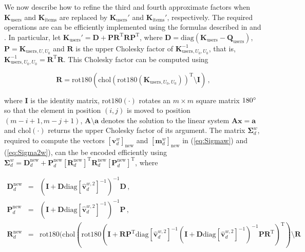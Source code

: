 \documentclass{article}
\begin{document}
We now describe how to refine the third and fourth approximate factors when $\mathbf{K}_\text{users}$ and
$\mathbf{K}_\text{items}$ are replaced by $\mathbf{K}_\text{users}'$ and $\mathbf{K}_\text{items}'$, respectively.
The required operations are can be efficiently implemented using the formulas
described in \citep{Guzman2007} and \citep{Lazaro2010}.
In particular, let $\mathbf{K}_\text{users}' = \mathbf{D} + \mathbf{P}
\mathbf{R}^\text{T} \mathbf{R} \mathbf{P}^\text{T}$,
where $\mathbf{D} = \text{diag}(\mathbf{K}_\text{users}-\mathbf{Q}_\text{users})$,
$\mathbf{P} = \mathbf{K}_{\text{users},U,U_0}$ and
$\mathbf{R}$ is the upper Cholesky factor of $\mathbf{K}_{\text{users},U_0,U_0}^{-1}$, that is,
$\mathbf{K}_{\text{users},U_0,U_0}^{-1} = \mathbf{R}^\text{T} \mathbf{R}$.
This Cholesky factor can be computed using

\begin{equation}
\mathbf{R} = \text{rot180}(\text{chol}(\text{rot180}(\mathbf{K}_{\text{users},U_0,U_0}))^\text{T} \setminus \mathbf{I})\,,
\end{equation}

where $\mathbf{I}$ is the identity matrix, $\text{rot180}(\cdot)$ rotates an $m \times m$ square matrix $180\degree$
so that the element in position $(i,j)$ is moved to position $(m - i + 1, m - j + 1)$,
$\mathbf{A} \setminus \mathbf{a}$ denotes the solution to the linear system $\mathbf{A} \mathbf{x} = \mathbf{a}$ and
$\text{chol}(\cdot)$ returns the upper Cholesky factor of its argument.
The matrix $\bm \Sigma_d^w $, required to compute the vectors $[\mathbf{v}_{d}^{w}]_\text{new}$ and $[\mathbf{m}_{d}^{w}]_\text{new}$
in (\ref{eq:Sigmaw}) and (\ref{eq:Sigma2w}), can the be encoded efficiently using
$\bm \Sigma_d^w = \mathbf{D}^\text{new}_d + \mathbf{P}^\text{new}_d
[\mathbf{R}^\text{new}_d]^\text{T} \mathbf{R}^\text{new}_d [\mathbf{P}^\text{new}_d]^\text{T}$,
where

\begin{eqnarray}
\mathbf{D}^\text{new}_d & = & \left(\mathbf{I} + \mathbf{D}
\text{diag}[\hat{\mathbf{v}}_d^{w,2}]^{-1} \right)^{-1} \mathbf{D}\,,\\
\mathbf{P}^\text{new}_d & = & \left(\mathbf{I} + \mathbf{D}
\text{diag}[\hat{\mathbf{v}}_d^{w,2}]^{-1} \right)^{-1} \mathbf{P}\,,\\
\mathbf{R}^\text{new}_d & = & \text{rot180}(\text{chol}(\text{rot180}(\mathbf{I} + 
\mathbf{R} \mathbf{P}^\text{T} \text{diag}[\hat{\mathbf{v}}_d^{w,2}]^{-1}
(\mathbf{I} + \mathbf{D} \text{diag}[\hat{\mathbf{v}}_d^{w,2}]^{-1})^{-1}
\mathbf{P} \mathbf{R}^\text{T})^\text{T}) \setminus \mathbf{R}
\end{eqnarray}
\end{document}
